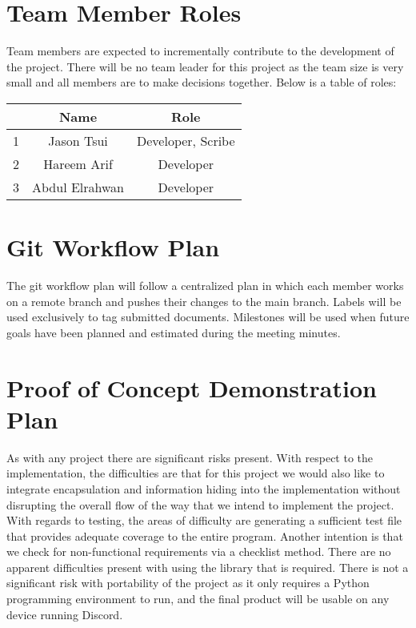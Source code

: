 \documentclass[12pt]{article}
\begin{document}
\section{Team Member Roles}

\tab Team members are expected to incrementally contribute to the development of the project. There will be no team leader for this project as the team size is very small and all members are to make decisions together. Below is a table of roles:

\begin{center}
  \begin{tabular}{|c|c|c|}
  \hline
  &Name & Role \\ \hline
  1& Jason Tsui & Developer, Scribe\\ 
  2& Hareem Arif & Developer\\ 
  3&Abdul Elrahwan & Developer\\ \hline
\end{tabular}
\end{center}

\section{Git Workflow Plan}

\tab The git workflow plan will follow a centralized plan in which each member works on a remote branch and pushes their changes to the main branch. Labels will be used exclusively to tag submitted documents. Milestones will be used when future goals have been planned and estimated during the meeting minutes. 

\section{Proof of Concept Demonstration Plan}

\tab As with any project there are significant risks present. With respect to the implementation, the difficulties are that for this project we would also like to integrate encapsulation and information hiding into the implementation without disrupting the overall flow of the way that we intend to implement the project. With regards to testing, the areas of difficulty are generating a sufficient test file that provides adequate coverage to the entire program.  Another intention is that we check for non-functional requirements via a checklist method.  There are no apparent difficulties present with using the library that is required.  There is not a significant risk with portability of the project as it only requires a Python programming environment to run, and the final product will be usable on any device running Discord. \\
\end{document}
